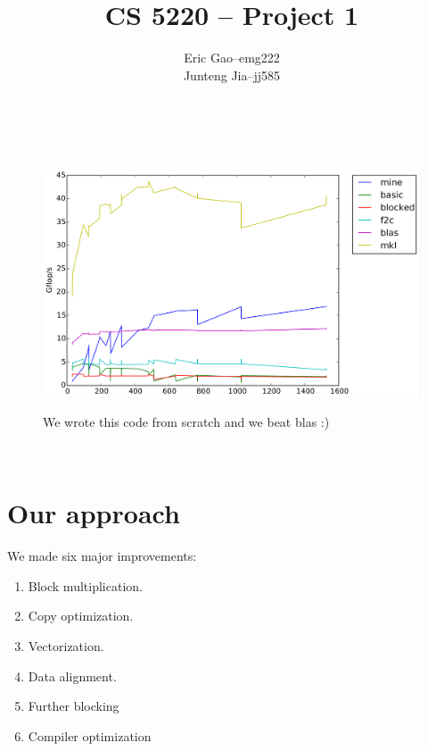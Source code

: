 \documentclass[11pt]{article}
\title{CS 5220 -- Project 1} %
\author{
  \begin{tabular}{l c l}
    Eric Gao & -- & emg222\\
    Junteng Jia & -- & jj585
  \end{tabular}\\
  \rule{\linewidth}{0.4pt}
}
\date{}
\begin{document}
    \thispagestyle{empty}
    \maketitle

    \vspace{1cm}

    \begin{figure}[H]
        \centering
        \includegraphics[width=6.5in]{timing_vector_32_64_cc_cp_align.png}
        
        \begin{center}
        We wrote this code from scratch and we beat blas :)         
        \end{center}
    \end{figure}


    \clearpage

    \tableofcontents\

    \pagebreak
    \section{Our approach}
    We made six major improvements:
     \begin{enumerate}
            \item Block multiplication.
            \item Copy optimization.
            \item Vectorization.
            \item Data alignment.
            \item Further blocking
            \item Compiler optimization
     \end{enumerate}
    
        \vspace{1cm}
                
\end{document}

